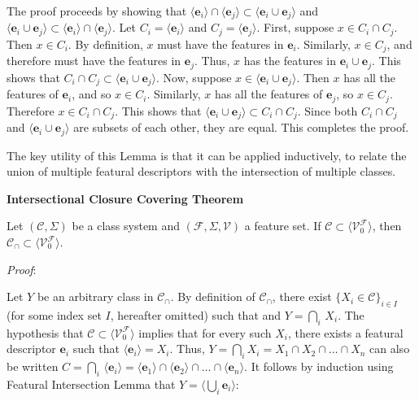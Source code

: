 \documentclass[11pt, oneside]{article}   	%
\begin{document}
The proof proceeds by showing that $ \langle \mathbf{e}_i \rangle \cap \langle \mathbf{e}_j \rangle \subset \langle \mathbf{e}_i \cup \mathbf{e}_j \rangle$ and $\langle \mathbf{e}_i \cup \mathbf{e}_j \rangle \subset  \langle \mathbf{e}_i \rangle \cap \langle \mathbf{e}_j \rangle$.
Let $C_i = \langle \mathbf{e}_i \rangle$ and $C_j = \langle \mathbf{e}_j \rangle$.
First, suppose $x \in C_i \cap C_j$. Then $x \in C_i$. By definition, $x$ must have the features in $\mathbf{e}_i$.
Similarly, $x \in C_j$, and therefore must have the features in $\mathbf{e}_j$.
Thus, $x$ has the features in $\mathbf{e}_i \cup \mathbf{e}_j$. This shows that $C_i \cap C_j \subset \langle \mathbf{e}_i \cup \mathbf{e}_j \rangle$.
Now, suppose $x \in \langle \mathbf{e}_i \cup \mathbf{e}_j \rangle$. Then $x$ has all the features of $\mathbf{e}_i$, and so $x \in C_i$.
Similarly, $x$ has all the features of $\mathbf{e}_j$, so $x \in C_j$. Therefore $x \in C_i \cap C_j$. This shows that $\langle \mathbf{e}_i \cup \mathbf{e}_j \rangle \subset C_i \cap C_j$.
Since both $C_i \cap C_j$ and $\langle \mathbf{e}_i \cup \mathbf{e}_j \rangle$ are subsets of each other, they are equal.
This completes the proof.

\vspace{\baselineskip} \noindent The key utility of this Lemma is that it can be applied inductively, to relate the union of multiple featural descriptors with the intersection of multiple classes.

\vspace{\baselineskip} \noindent \textbf{Intersectional Closure Covering Theorem}

Let $(\mathcal C, \Sigma)$ be a class system and $(\mathcal F, \Sigma, \mathcal V)$ a feature set. If $\mathcal C \subset \langle \mathcal V_0^\mathcal F \rangle$, then $\mathcal C_\cap \subset\langle \mathcal V_0^\mathcal F \rangle $.

\vspace{\baselineskip} \noindent \textit{Proof}:

Let $Y$ be an arbitrary class in $\mathcal C_\cap$. By definition of $\mathcal C_\cap$, there exist $\{X_i \in \mathcal C\}_{i \in I}$ (for some index set $I$, hereafter omitted) such that and $Y = \bigcap_i \, X_i$. The hypothesis that $\mathcal C \subset \langle \mathcal V_0^\mathcal F \rangle $ implies that for every such $X_i$, there exists a featural descriptor $\mathbf{e}_i$ such that $\langle \mathbf{e}_i \rangle = X_i$. Thus, $Y = \bigcap_i X_i = X_1 \cap X_2 \cap \ldots \cap X_n$ can also be written $C = \bigcap_i \, \langle \mathbf{e}_i \rangle = \langle \mathbf{e}_1 \rangle \cap \langle \mathbf{e}_2 \rangle \cap \ldots \cap \langle \mathbf{e}_n \rangle$. It follows by induction using Featural Intersection Lemma that $Y = \langle \bigcup_i \mathbf{e}_i \rangle$:
\end{document}
